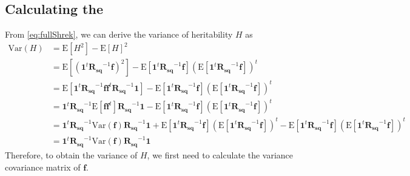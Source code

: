 \documentclass{book}
\begin{document}
		\subsection{Calculating the }
			From \cref{eq:fullShrek}, we can derive the variance of heritability $H$ as 
			\begin{align}
				\mathrm{Var}(H) &= \mathrm{E}[H^2]-\mathrm{E}[H]^2\nonumber\\
				&=\mathrm{E}[(\boldsymbol{1}^t\boldsymbol{R_{sq}}^{-1}\boldsymbol{f})^2]-\mathrm{E}[\boldsymbol{1}^t\boldsymbol{R_{sq}}^{-1}\boldsymbol{f}](\mathrm{E}[\boldsymbol{1}^t\boldsymbol{R_{sq}}^{-1}\boldsymbol{f}])^t \nonumber \\
				&=\mathrm{E}[\boldsymbol{1}^t\boldsymbol{R_{sq}}^{-1}\boldsymbol{ff}^t\boldsymbol{R_{sq}}^{-1}\boldsymbol{1}]-\mathrm{E}[\boldsymbol{1}^t\boldsymbol{R_{sq}}^{-1}\boldsymbol{f}](\mathrm{E}[\boldsymbol{1}^t\boldsymbol{R_{sq}}^{-1}\boldsymbol{f}])^t \nonumber \\
				&=\boldsymbol{1}^t\boldsymbol{R_{sq}}^{-1}\mathrm{E}[\boldsymbol{ff}^t]\boldsymbol{R_{sq}}^{-1}\boldsymbol{1}-\mathrm{E}[\boldsymbol{1}^t\boldsymbol{R_{sq}}^{-1}\boldsymbol{f}](\mathrm{E}[\boldsymbol{1}^t\boldsymbol{R_{sq}}^{-1}\boldsymbol{f}])^t \nonumber \\
				&=\boldsymbol{1}^t\boldsymbol{R_{sq}}^{-1}\mathrm{Var}(\boldsymbol{f})\boldsymbol{R_{sq}}^{-1}\boldsymbol{1}+\mathrm{E}[\boldsymbol{1}^t\boldsymbol{R_{sq}}^{-1}\boldsymbol{f}](\mathrm{E}[\boldsymbol{1}^t\boldsymbol{R_{sq}}^{-1}\boldsymbol{f}])^t-\mathrm{E}[\boldsymbol{1}^t\boldsymbol{R_{sq}}^{-1}\boldsymbol{f}](\mathrm{E}[\boldsymbol{1}^t\boldsymbol{R_{sq}}^{-1}\boldsymbol{f}])^t \nonumber\\
				&=\boldsymbol{1}^t\boldsymbol{R_{sq}}^{-1}\mathrm{Var}(\boldsymbol{f})\boldsymbol{R_{sq}}^{-1}\boldsymbol{1}
				\label{eq:varHvarf}
			\end{align}
			Therefore, to obtain the variance of $H$, we first need to calculate the variance covariance matrix of $\boldsymbol{f}$.
			
\end{document}
